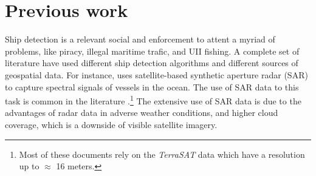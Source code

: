 \section{Previous work}

Ship detection is a relevant social and enforcement to attent a myriad of problems, like piracy, illegal maritime trafic, and UII fishing.
A complete set of literature have used different ship detection algorithms and different sources of geospatial data. For instance,  
uses satellite-based synthetic aperture radar (SAR) to capture spectral signals of vessels in the ocean. The use of SAR data to this task is 
common in the literature \cite{Margarit2009, Brusch2011, Corbane2008, Paes2010}.\footnote{Most of these documents rely on the \textit{TerraSAT} 
data which have a resolution up to $\approx$ 16 meters.} The extensive use of SAR data is due to the advantages of radar data in adverse weather
conditions, and higher cloud coverage, which is a downside of visible satellite imagery. 
